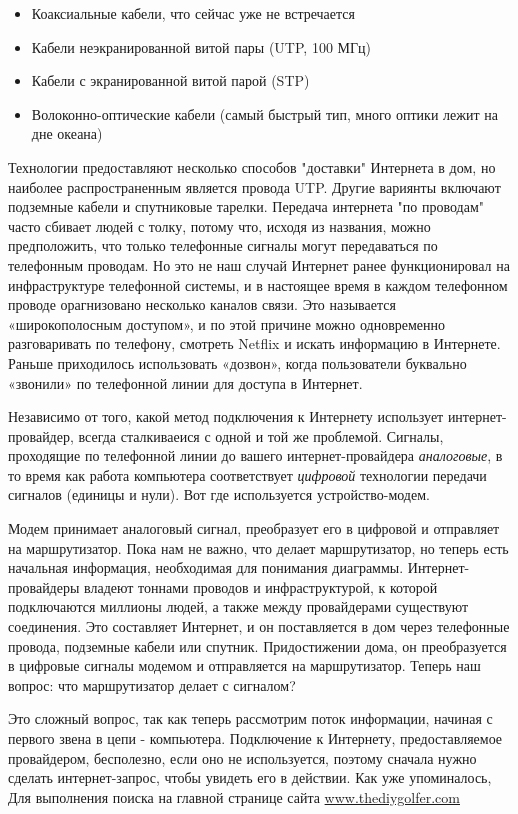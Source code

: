 \documentclass{report}
\begin{document}
\begin{itemize}
\tightlist
\item
  Коаксиальные кабели, что сейчас уже не встречается
\item
  Кабели неэкранированной витой пары (UTP, 100 МГц)
\item
  Кабели с экранированной витой парой (STP)
\item
  Волоконно-оптические кабели (самый быстрый тип, много оптики лежит на
  дне океана)
\end{itemize}

Технологии предоставляют несколько способов "доставки" Интернета в дом,
но наиболее распространенным является провода UTP. Другие вариянты
включают подземные кабели и спутниковые тарелки. Передача интернета "по
проводам" часто сбивает людей с толку, потому что, исходя из названия,
можно предположить, что только телефонные сигналы могут передаваться по
телефонным проводам. Но это не наш случай Интернет ранее функционировал
на инфраструктуре телефонной системы, и в настоящее время в каждом
телефонном проводе орагнизовано несколько каналов связи. Это называется
«широкополосным доступом», и по этой причине можно одновременно
разговаривать по телефону, смотреть Netflix и искать информацию в
Интернете. Раньше приходилось использовать «дозвон», когда пользователи
буквально «звонили» по телефонной линии для доступа в Интернет.

Независимо от того, какой метод подключения к Интернету использует
интернет-провайдер, всегда сталкиваеися с одной и той же проблемой.
Сигналы, проходящие по телефонной линии до вашего интернет-провайдера
\emph{аналоговые}, в то время как работа компьютера соответствует
\emph{цифровой} технологии передачи сигналов (единицы и нули). Вот где
используется устройство-модем.

Модем принимает аналоговый сигнал, преобразует его в цифровой и
отправляет на маршрутизатор. Пока нам не важно, что делает
маршрутизатор, но теперь есть начальная информация, необходимая для
понимания диаграммы. Интернет-провайдеры владеют тоннами проводов и
инфраструктурой, к которой подключаются миллионы людей, а также между
провайдерами существуют соединения. Это составляет Интернет, и он
поставляется в дом через телефонные провода, подземные кабели или
спутник. Придостижении дома, он преобразуется в цифровые сигналы модемом
и отправляется на маршрутизатор. Теперь наш вопрос: что маршрутизатор
делает с сигналом?

Это сложный вопрос, так как теперь рассмотрим поток информации, начиная
с первого звена в цепи - компьютера. Подключение к Интернету,
предоставляемое провайдером, бесполезно, если оно не используется,
поэтому сначала нужно сделать интернет-запрос, чтобы увидеть его в
действии. Как уже упоминалось, Для выполнения поиска на главной странице
сайта \href{http://www.thediygolfer.com}{www.thediygolfer.com}
\end{document}

